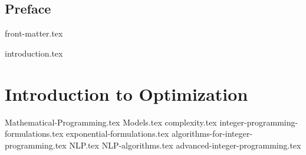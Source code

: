 \documentclass[letter,11pt]{book}
\begin{document}
\chapter{Preface}
 
  
{front-matter.tex}
\tableofcontents

{introduction.tex}

\part{Introduction to Optimization}
{Mathematical-Programming.tex}
{Models.tex}
{complexity.tex}
{integer-programming-formulations.tex}
{exponential-formulations.tex}
{algorithms-for-integer-programming.tex}
{NLP.tex}
{NLP-algorithms.tex}
{advanced-integer-programming.tex}

\ifx\footfullcite\undefined  %
  
  
\else                        %
  \printbibliography
\fi
\end{document}
